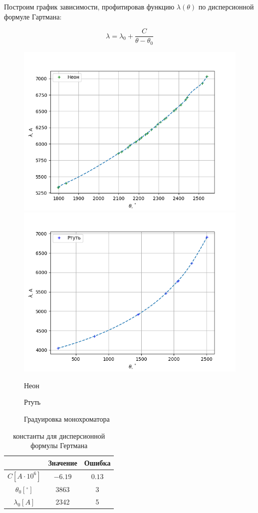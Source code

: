\documentclass[a4paper, 12pt]{article}%
\begin{document}
Построим график зависимости, профитировав функцию $ \lambda (\theta) $ по дисперсионной формуле Гартмана:
	
	\begin{equation}\label{labda(thta)}
	\lambda = \lambda_0 + \dfrac{C}{\theta - \theta_0}
	\end{equation}
	
\newpage	
	
	\begin{figure}[ht!]
            \includegraphics[width=.6\textwidth]{1.png}\hfill
            \includegraphics[width=.6\textwidth]{2.png}\hfill
            \caption{Неон}
            \caption{Ртуть}
        \end{figure}
	
	\begin{figure}[h!]
		\caption{Градуировка монохроматора}
		\label{graf_g}
	\end{figure} 
	
	\begin{table}[H]
		\begin{center}
			\begin{tabular}{|c|c|c|}
\hline & Значение & Ошибка \\
\hline$C[A \cdot 10^6]$ & $-6.19$ & $0.13$ \\
\hline$\theta_0\left[^{\circ}\right]$ & 3863 & 3 \\
\hline$\lambda_0[A]$ & 2342 & 5 \\
\hline
\end{tabular}
		\caption{константы для дисперсионной формулы Гертмана}
		\end{center}
		\label{}
	\end{table}
\end{document}
